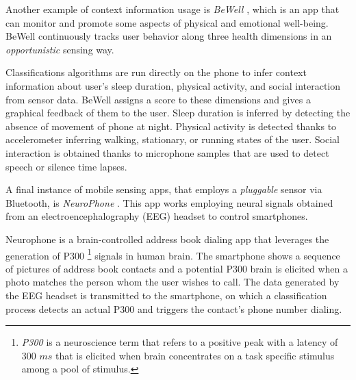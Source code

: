 Another example of context information usage is \emph{BeWell} \cite{Lane2011a}, which is an app that can monitor and promote some aspects of physical and emotional well-being.
BeWell continuously tracks user behavior along three health dimensions in an \emph{opportunistic} sensing way.

Classifications algorithms are run directly on the phone to infer context information about user's sleep duration, physical activity, and social interaction from sensor data.
BeWell assigns a score to these dimensions and gives a graphical feedback of them to the user.
Sleep duration is inferred by detecting the absence of movement of phone at night.
Physical activity is detected thanks to accelerometer inferring walking, stationary, or running states of the user.
Social interaction is obtained thanks to microphone samples that are used to detect speech or silence time lapses.


A final instance of mobile sensing apps, that employs a \emph{pluggable} sensor via Bluetooth, is \emph{NeuroPhone} \cite{Campbell2010}.
This app works employing neural signals obtained from an electroencephalography (EEG) headset to control smartphones.


Neurophone is a brain-controlled address book dialing app that leverages the generation of P300 \footnote{\emph{P300} is a neuroscience term that refers to a positive peak with a latency of 300 $ms$ that is elicited when brain concentrates on a task specific stimulus among a pool of stimulus.} signals in human brain.
The smartphone shows a sequence of pictures of address book contacts and a potential P300 brain is elicited when a photo matches the person whom the user wishes to call.
The data generated by the EEG headset is transmitted to the smartphone, on which a classification process detects an actual P300 and triggers the contact’s phone number dialing.



